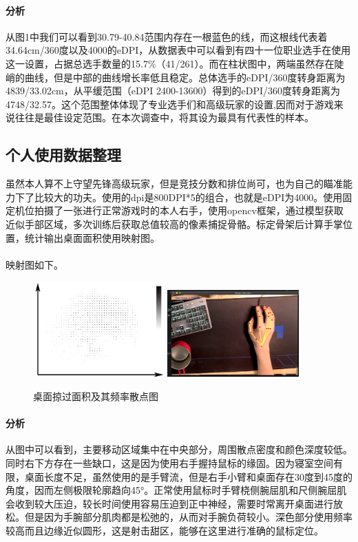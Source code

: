 \documentclass[UTF8]{ctexart}
\begin{document}
\paragraph{分析}
    从图1中我们可以看到30.79-40.84范围内存在一根蓝色的线，而这根线代表着34.64cm/360度以及4000的eDPI，从数据表中可以看到有四十一位职业选手在使用这一设置，占据总选手数量的15.7\%（41/261）。而在柱状图中，两端虽然存在陡峭的曲线，但是中部的曲线增长率低且稳定。总体选手的eDPI/360度转身距离为4839/33.02cm，从平缓范围（eDPI 2400-13600）得到的eDPI/360度转身距离为4748/32.57。这个范围整体体现了专业选手们和高级玩家的设置,因而对于游戏来说往往是最佳设定范围。在本次调查中，将其设为最具有代表性的样本。
\subsection{个人使用数据整理}
    虽然本人算不上守望先锋高级玩家，但是竞技分数和排位尚可，也为自己的瞄准能力下了比较大的功夫。使用的dpi是800DPI*5的组合，也就是eDPI为4000。使用固定机位拍摄了一张进行正常游戏时的本人右手，使用opencv框架，通过模型获取近似手部区域，多次训练后获取总值较高的像素捕捉骨骼。标定骨架后计算手掌位置，统计输出桌面面积使用映射图。
\paragraph{}映射图如下。
    \begin{figure}[htbp]
        \centering
        \includegraphics[width=0.45\textwidth]{point.png}
        \includegraphics[width=0.45\textwidth]{test.png}
        \caption{桌面掠过面积及其频率散点图}
    \end{figure}
    \paragraph{分析}
    从图中可以看到，主要移动区域集中在中央部分，周围散点密度和颜色深度较低。同时右下方存在一些缺口，这是因为使用右手握持鼠标的缘固。因为寝室空间有限，桌面长度不足，虽然使用的是手臂流，但是右手小臂和桌面存在30度到45度的角度，因而左侧极限轮廓趋向45°。正常使用鼠标时手臂桡侧腕屈肌和尺侧腕屈肌会收到较大压迫，较长时间使用容易压迫到正中神经，需要时常离开桌面进行放松。但是因为手腕部分肌肉都是松弛的，从而对手腕负荷较小。深色部分使用频率较高而且边缘近似圆形，这是射击甜区，能够在这里进行准确的鼠标定位。
\end{document}
